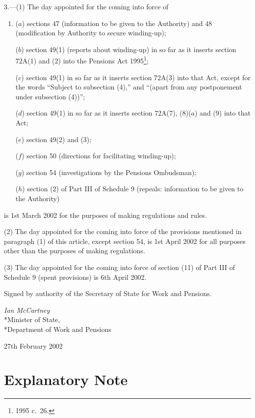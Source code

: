 \documentclass[12pt,a4paper]{article}
\begin{document}
3.---(1)  The day appointed for the coming into force of
\begin{enumerate}\item[]
($a$) sections 47 (information to be given to the Authority) and 48 (modification by Authority to secure winding-up);

($b$) section 49(1) (reports about winding-up) in so far as it inserts section 72A(1) and (2) into the Pensions Act 1995\footnote{1995 c.\ 26.};

($c$) section 49(1) in so far as it inserts section 72A(3) into that Act, except for the words “Subject to subsection (4),” and “(apart from any postponement under subsection (4))”;

($d$) section 49(1) in so far as it inserts section 72A(7), (8)($a$)  and (9) into that Act;

($e$) section 49(2) and (3);

($f$) section 50 (directions for facilitating winding-up);

($g$) section 54 (investigations by the Pensions Ombudsman);

($h$) section (2) of Part III of Schedule 9 (repeals: information to be given to the Authority)
\end{enumerate}
is 1st March 2002 for the purposes of making regulations and rules.

(2) The day appointed for the coming into force of the provisions mentioned in paragraph (1) of this article, except section 54, is 1st April 2002 for all purposes other than the purposes of making regulations.

(3) The day appointed for the coming into force of section (11) of Part III of Schedule 9 (spent provisions) is 6th April 2002. 

\bigskip

Signed 
by authority of the Secretary of State for Work and Pensions.

{\raggedleft
\emph{Ian McCartney}\\*Minister of State,\\*Department of Work and Pensions

}

27th February 2002

\small

\part{Explanatory Note}

\renewcommand\parthead{— Explanatory Note}
\end{document}
